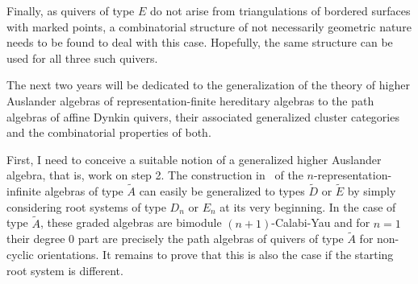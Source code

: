 \documentclass[a4paper,oneside,svgnames]{amsart}
\theoremstyle{plain}
\theoremstyle{definition}
\begin{document}
 Finally, as quivers of type $E$ do not arise from triangulations of bordered
 surfaces with marked points, a combinatorial structure of not necessarily
 geometric nature needs to be found to deal with this case. Hopefully, the
 same structure can be used for all three such quivers.

 The next two years will be dedicated to the generalization of the theory
 of higher Auslander algebras of representation-finite hereditary algebras
 to the path algebras of affine Dynkin quivers, their associated generalized
 cluster categories and the combinatorial properties of both.

 First, I need to conceive a suitable notion of a generalized higher Auslander
 algebra, that is, work on step 2. The construction in~\cite[Section~5]{hio}
 of the $n$-representation-infinite algebras of type $\tilde{A}$ can easily be
 generalized to types $\tilde{D}$ or $\tilde{E}$ by simply considering root
 systems of type $D_n$ or $E_n$ at its very beginning. In the case of type
 $\tilde{A}$, these graded algebras are bimodule $(n+1)$-Calabi-Yau and for $n = 1$
 their degree 0 part are precisely the path algebras of quivers of type $\tilde{A}$
 for non-cyclic orientations. It remains to prove that this is also the case
 if the starting root system is different.
 
\end{document}
